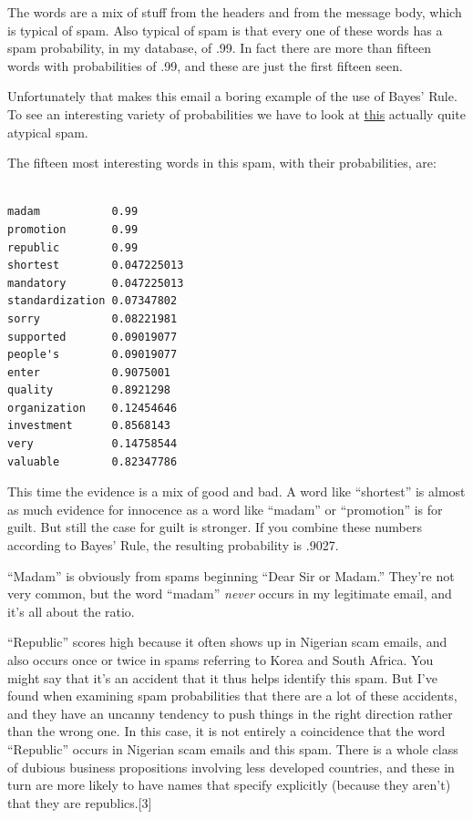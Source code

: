 The words are a mix of stuff from the headers and from the message body,
which is typical of spam. Also typical of spam is that every one of
these words has a spam probability, in my database, of .99. In fact
there are more than fifteen words with probabilities of .99, and these
are just the first fifteen seen.

Unfortunately that makes this email a boring example of the use of
Bayes' Rule. To see an interesting variety of probabilities we have to
look at
\href{https://sep.turbifycdn.com/ty/cdn/paulgraham/spam2.txt?t=1688221954&}{this}
actually quite atypical spam.

The fifteen most interesting words in this spam, with their
probabilities, are:

\begin{verbatim}

madam           0.99
promotion       0.99
republic        0.99
shortest        0.047225013
mandatory       0.047225013
standardization 0.07347802
sorry           0.08221981
supported       0.09019077
people's        0.09019077
enter           0.9075001
quality         0.8921298
organization    0.12454646
investment      0.8568143
very            0.14758544
valuable        0.82347786 
\end{verbatim}

This time the evidence is a mix of good and bad. A word like
``shortest'' is almost as much evidence for innocence as a word like
``madam'' or ``promotion'' is for guilt. But still the case for guilt is
stronger. If you combine these numbers according to Bayes' Rule, the
resulting probability is .9027.

``Madam'' is obviously from spams beginning ``Dear Sir or Madam.''
They're not very common, but the word ``madam'' \emph{never} occurs in
my legitimate email, and it's all about the ratio.

``Republic'' scores high because it often shows up in Nigerian scam
emails, and also occurs once or twice in spams referring to Korea and
South Africa. You might say that it's an accident that it thus helps
identify this spam. But I've found when examining spam probabilities
that there are a lot of these accidents, and they have an uncanny
tendency to push things in the right direction rather than the wrong
one. In this case, it is not entirely a coincidence that the word
``Republic'' occurs in Nigerian scam emails and this spam. There is a
whole class of dubious business propositions involving less developed
countries, and these in turn are more likely to have names that specify
explicitly (because they aren't) that they are republics.{[}3{]}

